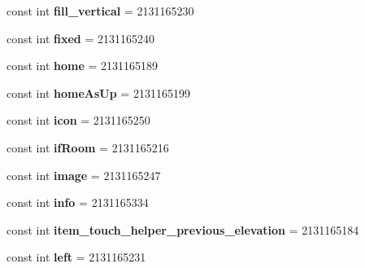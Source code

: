 \begin{DoxyCompactItemize}
const int {\bfseries fill\+\_\+vertical} = 2131165230
\item 
\mbox{\label{class_sample_app_1_1_droid_1_1_resource_1_1_id_ad19970ef7fab591f56edd8b252b7171a}} 
const int {\bfseries fixed} = 2131165240
\item 
\mbox{\label{class_sample_app_1_1_droid_1_1_resource_1_1_id_a3abc2ea6fbe38c005ab6cbd984a6c701}} 
const int {\bfseries home} = 2131165189
\item 
\mbox{\label{class_sample_app_1_1_droid_1_1_resource_1_1_id_a7234b37d39c8264ac9d3a5fc753378a5}} 
const int {\bfseries home\+As\+Up} = 2131165199
\item 
\mbox{\label{class_sample_app_1_1_droid_1_1_resource_1_1_id_a4d0df17a5b6e465f45a50236e2f8afdc}} 
const int {\bfseries icon} = 2131165250
\item 
\mbox{\label{class_sample_app_1_1_droid_1_1_resource_1_1_id_ab07ac428307e2ea23dc8bc61dc205e7d}} 
const int {\bfseries if\+Room} = 2131165216
\item 
\mbox{\label{class_sample_app_1_1_droid_1_1_resource_1_1_id_afbda27b6f94fdb530e7769933d49fbb0}} 
const int {\bfseries image} = 2131165247
\item 
\mbox{\label{class_sample_app_1_1_droid_1_1_resource_1_1_id_a5cee78a98277eaf039e9751596014e77}} 
const int {\bfseries info} = 2131165334
\item 
\mbox{\label{class_sample_app_1_1_droid_1_1_resource_1_1_id_a98885adb1a34a936f4ee065b1c7cdd88}} 
const int {\bfseries item\+\_\+touch\+\_\+helper\+\_\+previous\+\_\+elevation} = 2131165184
\item 
\mbox{\label{class_sample_app_1_1_droid_1_1_resource_1_1_id_af4a95f64e3b5b5544b24df54318644d6}} 
const int {\bfseries left} = 2131165231

\end{DoxyCompactItemize}
